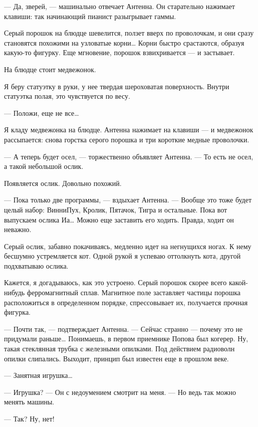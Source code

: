    — Да,  зверей,  — машинально  отвечает  Антенна. Он  старательно  нажимает
   клавиши: так начинающий пианист разыгрывает гаммы.

   Серый порошок  на блюдце  шевелится, ползет  вверх по  проволочкам, и  они
   сразу становятся  похожими на  узловатые корни…  Корни быстро  срастаются,
   образуя  какую-то  фигурку.  Еще  мгновение,  порошок  взвихривается  —  и
   застывает.

   На блюдце стоит медвежонок.

   Я беру статуэтку  в руки,  у нее твердая  шероховатая поверхность.  Внутри
   статуэтка полая, это чувствуется по весу.

   — Положи, еще не все…

   Я кладу медвежонка на блюдце. Антенна  нажимает на клавиши — и  медвежонок
   рассыпается:  снова  горстка   серого  порошка  и   три  короткие   медные
   проволочки.

   — А теперь  будет осел,  — торжественно объявляет  Антенна. —  То есть  не
   осел, а такой небольшой ослик.

   Появляется ослик. Довольно похожий.

   — Пока только две программы, —  вздыхает Антенна. — Вообще это тоже  будет
   целый набор:  ВинниПух,  Кролик,  Пятачок, Тигра  и  остальные.  Пока  вот
   выпускаем ослика  Иа… Можно  еще заставить  его ходить.  Правда, ходит  он
   неважно.

   Серый ослик, забавно  покачиваясь, медленно  идет на  негнущихся ногах.  К
   нему бесшумно устремляется  кот. Одной  рукой я  успеваю оттолкнуть  кота,
   другой подхватываю ослика.

   Кажется, я  догадываюсь,  как это  устроено.  Серый порошок  скорее  всего
   какой-нибудь  ферромагнитный  сплав.  Магнитное  поле  заставляет  частицы
   порошка расположиться в определенном порядке, спрессовывает их, получается
   прочная фигурка.

   — Почти так,  — подтверждает  Антенна. — Сейчас  странно —  почему это  не
   придумали раньше… Понимаешь,  в первом приемнике  Попова был когерер.  Ну,
   такая стеклянная  трубка с  железными  опилками. Под  действием  радиоволн
   опилки слипались. Выходит, принцип был известен еще в прошлом веке.

   — Занятная игрушка…

   — Игрушка? — Он с недоумением смотрит на меня. — Но ведь так можно  менять
   машины.

   — Так? Ну, нет!

